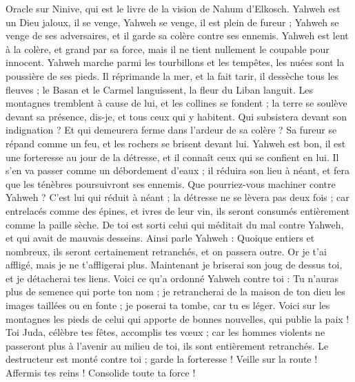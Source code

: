 \begin{multicols}{2}
\VerseOne{}Oracle sur Ninive, qui est le livre de la vision de Nahum d’Elkosch.
Yahweh est un Dieu jaloux, il se venge, Yahweh se venge, il est plein de fureur ; Yahweh se venge de ses adversaires, et il garde sa colère contre ses ennemis.
Yahweh est lent à la colère, et grand par sa force, mais il ne tient nullement le coupable pour innocent. Yahweh marche parmi les tourbillons et les tempêtes, les nuées sont la poussière de ses pieds.
Il réprimande la mer, et la fait tarir, il dessèche tous les fleuves ; le Basan et le Carmel languissent, la fleur du Liban languit.
Les montagnes tremblent à cause de lui, et les collines se fondent ; la terre se soulève devant sa présence, dis-je, et tous ceux qui y habitent.
Qui subsistera devant son indignation ? Et qui demeurera ferme dans l'ardeur de sa colère ? Sa fureur se répand comme un feu, et les rochers se brisent devant lui.
Yahweh est bon, il est une forteresse au jour de la détresse, et il connaît ceux qui se confient en lui.
Il s’en va passer comme un débordement d’eaux ; il réduira son lieu à néant, et fera que les ténèbres poursuivront ses ennemis.
Que pourriez-vous machiner contre Yahweh ? C’est lui qui réduit à néant ; la détresse ne se lèvera pas deux fois ;
car entrelacés comme des épines, et ivres de leur vin, ils seront consumés entièrement comme la paille sèche.
De toi est sorti celui qui méditait du mal contre Yahweh, et qui avait de mauvais desseins.
Ainsi parle Yahweh : Quoique entiers et nombreux, ils seront certainement retranchés, et on passera outre. Or je t'ai affligé, mais je ne t'affligerai plus.
Maintenant je briserai son joug de dessus toi, et je détacherai tes liens.
Voici ce qu’a ordonné Yahweh contre toi : Tu n’auras plus de semence qui porte ton nom ; je retrancherai de la maison de ton dieu les images taillées ou en fonte ; je poserai ta tombe, car tu es léger.
\VerseOne{}Voici sur les montagnes les pieds de celui qui apporte de bonnes nouvelles, qui publie la paix ! Toi Juda, célèbre tes fêtes, accomplis tes vœux ; car les hommes violents ne passeront plus à l'avenir au milieu de toi, ils sont entièrement retranchés.
Le destructeur est monté contre toi ; garde la forteresse ! Veille sur la route ! Affermis tes reins ! Consolide toute ta force !

\end{multicols}
